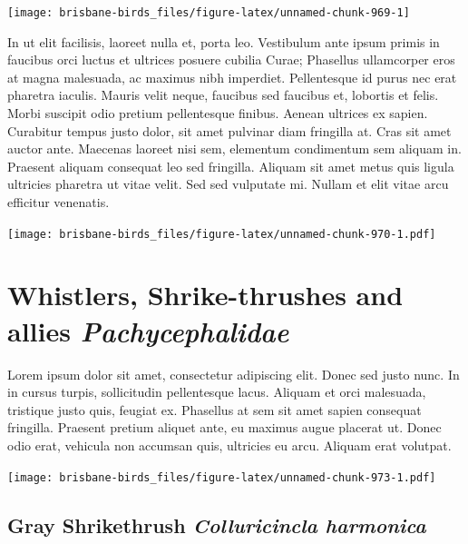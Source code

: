 \documentclass[]{book}
\let\origfigure\figure
\let\endorigfigure\endfigure
\renewenvironment{figure}[1][2] {
  \expandafter\origfigure\expandafter[H]
} {
  \endorigfigure
}
\begin{document}
\begin{figure}
\texttt{[image: brisbane-birds\_files/figure-latex/unnamed-chunk-969-1]} \caption{insert figure caption}\label{fig:unnamed-chunk-969}
\end{figure}

In ut elit facilisis, laoreet nulla et, porta leo. Vestibulum ante ipsum
primis in faucibus orci luctus et ultrices posuere cubilia Curae;
Phasellus ullamcorper eros at magna malesuada, ac maximus nibh
imperdiet. Pellentesque id purus nec erat pharetra iaculis. Mauris velit
neque, faucibus sed faucibus et, lobortis et felis. Morbi suscipit odio
pretium pellentesque finibus. Aenean ultrices ex sapien. Curabitur
tempus justo dolor, sit amet pulvinar diam fringilla at. Cras sit amet
auctor ante. Maecenas laoreet nisi sem, elementum condimentum sem
aliquam in. Praesent aliquam consequat leo sed fringilla. Aliquam sit
amet metus quis ligula ultricies pharetra ut vitae velit. Sed sed
vulputate mi. Nullam et elit vitae arcu efficitur venenatis.

\begin{figure}
\centering
\texttt{[image: brisbane-birds\_files/figure-latex/unnamed-chunk-970-1.pdf]}
\caption{\label{fig:unnamed-chunk-970}insert figure caption}
\end{figure}

\chapter{\texorpdfstring{Whistlers, Shrike-thrushes and allies
\emph{Pachycephalidae}}{Whistlers, Shrike-thrushes and allies Pachycephalidae}}\label{whistlers-shrike-thrushes-and-allies-pachycephalidae}

Lorem ipsum dolor sit amet, consectetur adipiscing elit. Donec sed justo
nunc. In in cursus turpis, sollicitudin pellentesque lacus. Aliquam et
orci malesuada, tristique justo quis, feugiat ex. Phasellus at sem sit
amet sapien consequat fringilla. Praesent pretium aliquet ante, eu
maximus augue placerat ut. Donec odio erat, vehicula non accumsan quis,
ultricies eu arcu. Aliquam erat volutpat.

\texttt{[image: brisbane-birds\_files/figure-latex/unnamed-chunk-973-1.pdf]}

\section{\texorpdfstring{Gray Shrikethrush \emph{Colluricincla
harmonica}}{Gray Shrikethrush Colluricincla harmonica}}\label{gray-shrikethrush-colluricincla-harmonica}
\end{document}

